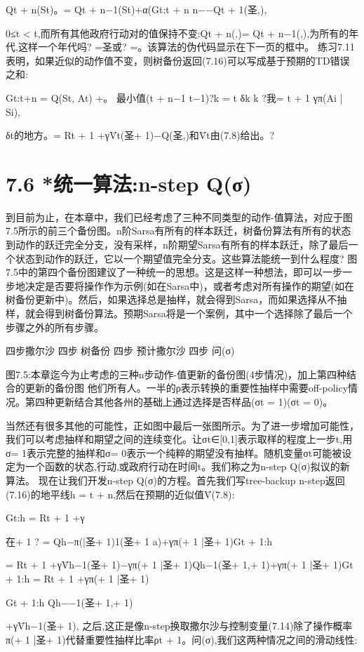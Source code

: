 Qt + n(St)。= Qt + n−1(St)+α(Gt:t + n n−−Qt + 1(圣,),

0≤t < t,而所有其他政府行动对的值保持不变:Qt + n(,)= Qt + n−1(,),为所有的年代,这样一个年代吗? =圣或? =。该算法的伪代码显示在下一页的框中。
练习7.11表明，如果近似的动作值不变，则树备份返回(7.16)可以写成基于预期的TD错误之和:


Gt:t+n = Q(St, At) +。
最小值(t + n−1 t−1)?k = t
δk
k ?我= t + 1
γπ(Ai | Si),

δt的地方。= Rt + 1 +γV̄t(圣+ 1)−Q(圣,)和V̄t由(7.8)给出。?

\section{7.6 *统一算法:n-step Q(σ)}
到目前为止，在本章中，我们已经考虑了三种不同类型的动作-值算法，对应于图7.5所示的前三个备份图。n阶Sarsa有所有的样本跃迁，树备份算法有所有的状态到动作的跃迁完全分支，没有采样，n阶期望Sarsa有所有的样本跃迁，除了最后一个状态到动作的跃迁，它以一个期望值完全分支。这些算法能统一到什么程度?
图7.5中的第四个备份图建议了一种统一的思想。这是这样一种想法，即可以一步一步地决定是否要将操作作为示例(如在Sarsa中)，或者考虑对所有操作的期望(如在树备份更新中)。然后，如果选择总是抽样，就会得到Sarsa，而如果选择从不抽样，就会得到树备份算法。预期Sarsa将是一个案例，其中一个选择除了最后一个步骤之外的所有步骤。

四步撒尔沙
四步
树备份
四步
预计撒尔沙
四步
问(σ)
 
图7.5:本章迄今为止考虑的三种n步动作-值更新的备份图(4步情况)，加上第四种结合的更新的备份图
他们所有人。一半的ρ表示转换的重要性抽样中需要off-policy情况。第四种更新结合其他各州的基础上通过选择是否样品(σt = 1)(σt = 0)。


当然还有很多其他的可能性，正如图中最后一张图所示。为了进一步增加可能性，我们可以考虑抽样和期望之间的连续变化。让σt∈[0,1]表示取样的程度上一步t,用σ= 1表示完整的抽样和σ= 0表示一个纯粹的期望没有抽样。随机变量σt可能被设定为一个函数的状态,行动,或政府行动在时间t。我们称之为n-step Q(σ)拟议的新算法。
现在让我们开发n-step Q(σ)的方程。首先我们写tree-backup n-step返回(7.16)的地平线h = t + n,然后在预期的近似值V̄(7.8):

Gt:h = Rt + 1 +γ

在+ 1 ? =
Qh−π(|圣+ 1)1(圣+ 1 a)+γπ(+ 1 |圣+ 1)Gt + 1:h

= Rt + 1 +γV̄h−1(圣+ 1)−γπ(+ 1 |圣+ 1)Qh−1(圣+ 1,+ 1)+γπ(+ 1 |圣+ 1)Gt + 1:h
= Rt + 1 +γπ(+ 1 |圣+ 1)

Gt + 1:h Qh−−1(圣+ 1,+ 1)

+γV̄h−1(圣+ 1),
之后,这正是像n-step换取撒尔沙与控制变量(7.14)除了操作概率π(+ 1 |圣+ 1)代替重要性抽样比率ρt + 1。问(σ),我们这两种情况之间的滑动线性:


